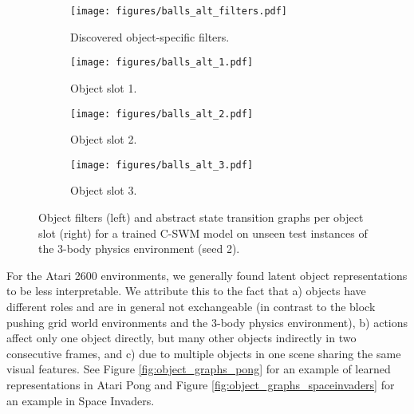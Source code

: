 \documentclass{article} %
\begin{document}
\begin{figure*}[htp]
\centering
  \begin{subfigure}[b]{0.38\textwidth}
  \centering
    \texttt{[image: figures/balls\_alt\_filters.pdf]}
    \caption{Discovered object-specific filters.}
  \end{subfigure}
  \begin{subfigure}[b]{0.18\textwidth}
  \centering
    \texttt{[image: figures/balls\_alt\_1.pdf]}
    \caption{Object slot 1.}
  \end{subfigure}
  \begin{subfigure}[b]{0.18\textwidth}
  \centering
    \texttt{[image: figures/balls\_alt\_2.pdf]}
    \caption{Object slot 2.}
  \end{subfigure}
  \begin{subfigure}[b]{0.18\textwidth}
  \centering
    \texttt{[image: figures/balls\_alt\_3.pdf]}
    \caption{Object slot 3.}
  \end{subfigure}
  \caption{Object filters (left) and abstract state transition graphs per object slot (right) for a trained C-SWM model on unseen test instances of the 3-body physics environment (seed 2).\label{fig:object_graphs_physics2}}
\end{figure*}

For the Atari 2600 environments, we generally found latent object representations to be less interpretable. We attribute this to the fact that a) objects have different roles and are in general not exchangeable (in contrast to the block pushing grid world environments and the 3-body physics environment), b) actions affect only one object directly, but many other objects indirectly in two consecutive frames, and c) due to multiple objects in one scene sharing the same visual features. See Figure \ref{fig:object_graphs_pong} for an example of learned representations in Atari Pong and Figure \ref{fig:object_graphs_spaceinvaders} for an example in Space Invaders.
\end{document}

